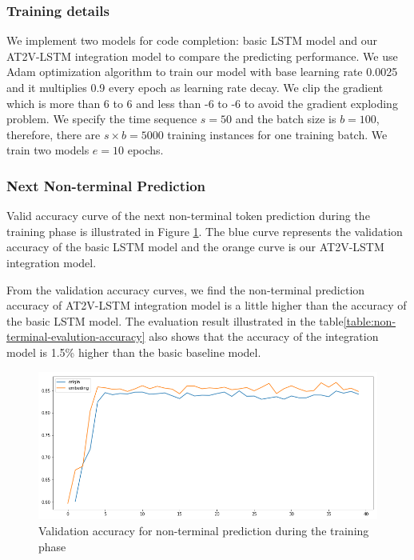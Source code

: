\documentclass[T, E]{compsoft}
\begin{document}
\subsubsection{Training details}
We implement two models for code completion: basic LSTM model and our AT2V-LSTM integration model to compare the predicting performance. 
We use Adam optimization algorithm to train our model with base learning rate 0.0025 and it multiplies 0.9 every epoch as learning rate decay. 
We clip the gradient which is more than 6 to 6 and less than -6 to -6 to avoid the gradient exploding problem.
We specify the time sequence $s=50$ and the batch size is $b=100$, therefore, there are $s \times b = 5000$ training instances for one training batch. 
We train two models $e=10$ epochs.

\subsubsection{Next Non-terminal Prediction} 
Valid accuracy curve of the next non-terminal token prediction during the training phase is illustrated in Figure \ref{fig:valid_accuracy_for_non_terminal}. 
The blue curve represents the validation accuracy of the basic LSTM model and the orange curve is our AT2V-LSTM integration model. 

From the validation accuracy curves, we find the non-terminal prediction accuracy of AT2V-LSTM integration model is a little higher than the accuracy of the basic LSTM model. The evaluation result illustrated in the table\ref{table:non-terminal-evalution-accuracy} also shows that the accuracy of the integration model is 1.5\% higher than the basic baseline model. 

\begin{figure}[!ht]
\centering
\includegraphics[scale=0.25]{pictures/nt_valid_accuracy.png}
\caption{Validation accuracy for non-terminal prediction during the training phase}
\label{fig:valid_accuracy_for_non_terminal}
\end{figure}
\end{document}
